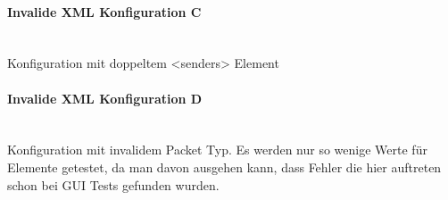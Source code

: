 \paragraph{Invalide XML Konfiguration C}
~\\Konfiguration mit doppeltem <senders> Element \\

\newpage 

\paragraph{Invalide XML Konfiguration D}
~\\Konfiguration mit invalidem Packet Typ. Es werden nur so wenige 
Werte für Elemente getestet, da man davon ausgehen kann, dass Fehler die hier auftreten schon bei GUI Tests
gefunden wurden.\\

\newpage 


